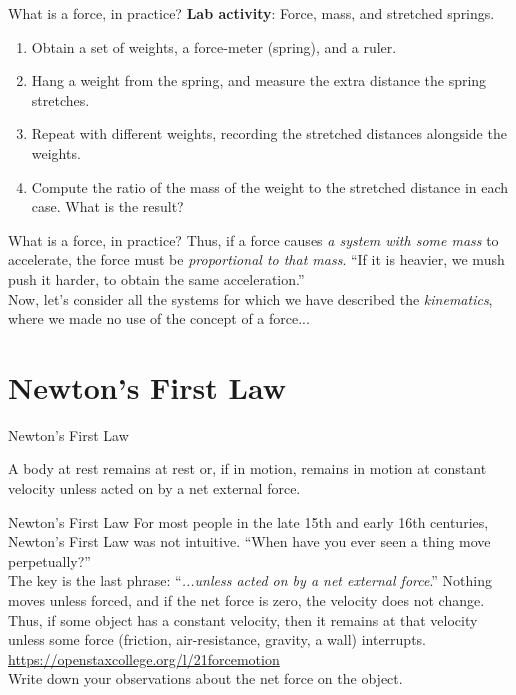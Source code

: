 \documentclass{beamer}
\begin{document}
\begin{frame}{What is a force, in practice?}
\textbf{Lab activity}: Force, mass, and stretched springs.
\begin{enumerate}
\item Obtain a set of weights, a force-meter (spring), and a ruler.
\item Hang a weight from the spring, and measure the extra distance the spring stretches.
\item Repeat with different weights, recording the stretched distances alongside the weights.
\item Compute the ratio of the mass of the weight to the stretched distance in each case.  What is the result?
\end{enumerate}
\end{frame}

\begin{frame}{What is a force, in practice?}
Thus, if a force causes \textit{a system with some mass} to accelerate, the force must be \textit{proportional to that mass}.  \alert{``If it is heavier, we mush push it harder, to obtain the same acceleration.''}  \\
\vspace{1cm}
Now, let's consider all the systems for which we have described the \textit{kinematics}, where we made no use of the concept of a force...
\end{frame}

\section{Newton's First Law}

\begin{frame}{Newton's First Law}
\begin{tcolorbox}[colback=white,colframe=red!40!blue,title=Newton's First Law]
\alert{A body at rest remains at rest or, if in motion, remains in motion at constant velocity unless acted on by a net external force.}
\end{tcolorbox}
\end{frame}

\begin{frame}{Newton's First Law}
\small
For most people in the late 15th and early 16th centuries, Newton's First Law was not intuitive.  ``When have you ever seen a thing move perpetually?''\\
\vspace{0.5cm}
The key is the last phrase: ``\textit{...unless acted on by a \alert{net} external force}.''  Nothing moves unless forced, and if the \alert{net} force is zero, the velocity does not change.  Thus, if some object has a constant velocity, then it remains at that velocity unless some force (friction, air-resistance, gravity, a wall) interrupts. \\
\vspace{0.5cm}
\url{https://openstaxcollege.org/l/21forcemotion} \\
Write down your observations about the net force on the object.
\end{frame}
\end{document}
